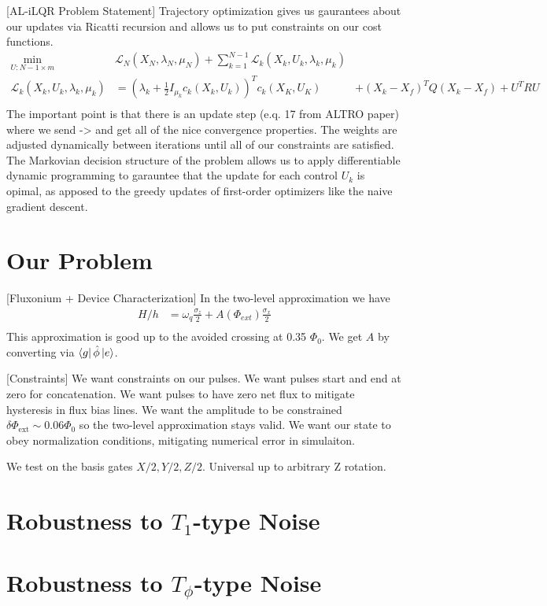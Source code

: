 \documentclass[
  amsfonts,
  amsmath,
  amssymb,
  aps,
  nobibnotes,
  prl,
  twocolumn,
]{revtex4-2}
\begin{document}
[AL-iLQR Problem Statement] Trajectory optimization gives us gaurantees
about our updates via Ricatti recursion
and allows us to put constraints on our cost functions.
\begin{align}
  \min_{U:N-1 \times m} &\mathcal{L}_{N}(X_{N}, \lambda_{N}, \mu_{N}) + \sum_{k = 1}^{N - 1} \mathcal{L}_{k}(X_{k}, U_{k}, \lambda_{k}, \mu_{k})\\
  \mathcal{L}_{k}(X_{k}, U_{k}, \lambda_{k}, \mu_{k}) &= (\lambda_{k} + \frac{1}{2}I_{\mu_{k}} c_{k}(X_{k}, U_{k}))^{T} c_{k}(X_{K}, U_{K})
  &+ (X_{k} - X_{f})^{T} Q (X_{k} - X_{f}) + U^{T} R U\\
\end{align}
The important point is that there is an update step (e.q. 17 from ALTRO paper) where we send \lambda -> \infty
and get all of the nice convergence properties. The weights are adjusted dynamically between iterations until
all of our constraints are satisfied. The Markovian decision structure of the problem allows
us to apply differentiable dynamic programming to garauntee that the update for each control $U_{k}$ is
opimal, as apposed to the greedy updates of first-order optimizers like the naive gradient descent.



\section{Our Problem}
[Fluxonium + Device Characterization] In the two-level
approximation we have
\begin{align}
  H/h &= \omega_{q} \frac{\sigma_{z}}{2} + A(\Phi_{ext}) \frac{\sigma_{x}}{2}\\
\end{align}
This approximation is good up to the avoided crossing at 0.35 $\Phi_{0}$. We get $A$
by converting via $\bra{g} \hat{\phi} \ket{e}$.

[Constraints] We want constraints on our pulses. We want pulses start and end at zero
for concatenation. We want pulses to have zero net flux to mitigate
hysteresis in flux bias lines.
We want the amplitude to be constrained
$\delta \Phi_{\textrm{ext}} \sim 0.06 \Phi_{0}$
so the two-level approximation stays valid.
We want our state to obey normalization conditions,
mitigating numerical error in simulaiton.

We test on the basis gates $X/2, Y/2, Z/2$. Universal
up to arbitrary Z rotation.


\section{Robustness to $T_{1}$-type Noise}



\section{Robustness to $T_{\phi}$-type Noise}




\end{document}
